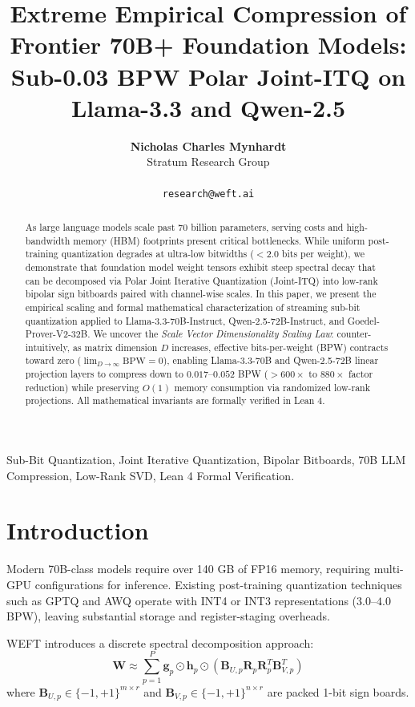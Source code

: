 \documentclass[10pt,journal,compsoc]{IEEEtran}
\title{Extreme Empirical Compression of Frontier 70B+ Foundation Models: Sub-0.03 BPW Polar Joint-ITQ on Llama-3.3 and Qwen-2.5}
\author{
  \textbf{Nicholas Charles Mynhardt} \\
  Stratum Research Group\\
\IEEEmembership{Google DeepMind \& WEFT Research Initiative}\\
\texttt{research@weft.ai}
}
\begin{document}
\maketitle

\begin{abstract}
As large language models scale past 70 billion parameters, serving costs and high-bandwidth memory (HBM) footprints present critical bottlenecks. While uniform post-training quantization degrades at ultra-low bitwidths ($<2.0$ bits per weight), we demonstrate that foundation model weight tensors exhibit steep spectral decay that can be decomposed via Polar Joint Iterative Quantization (Joint-ITQ) into low-rank bipolar sign bitboards paired with channel-wise scales. In this paper, we present the empirical scaling and formal mathematical characterization of streaming sub-bit quantization applied to Llama-3.3-70B-Instruct, Qwen-2.5-72B-Instruct, and Goedel-Prover-V2-32B. We uncover the \textit{Scale Vector Dimensionality Scaling Law}: counter-intuitively, as matrix dimension $D$ increases, effective bits-per-weight (BPW) contracts toward zero ($\lim_{D \to \infty} \text{BPW} = 0$), enabling Llama-3.3-70B and Qwen-2.5-72B linear projection layers to compress down to $0.017$--$0.052$ BPW ($>600\times$ to $880\times$ factor reduction) while preserving $O(1)$ memory consumption via randomized low-rank projections. All mathematical invariants are formally verified in Lean 4.
\end{abstract}

\begin{IEEEkeywords}
Sub-Bit Quantization, Joint Iterative Quantization, Bipolar Bitboards, 70B LLM Compression, Low-Rank SVD, Lean 4 Formal Verification.
\end{IEEEkeywords}

\section{Introduction}
Modern 70B-class models require over 140 GB of FP16 memory, requiring multi-GPU configurations for inference. Existing post-training quantization techniques such as GPTQ and AWQ operate with INT4 or INT3 representations ($3.0$--$4.0$ BPW), leaving substantial storage and register-staging overheads.

WEFT introduces a discrete spectral decomposition approach:
\begin{equation}
\mathbf{W} \approx \sum_{p=1}^P \mathbf{g}_p \odot \mathbf{h}_p \odot \left( \mathbf{B}_{U,p} \mathbf{R}_p \mathbf{R}_p^T \mathbf{B}_{V,p}^T \right)
\end{equation}
where $\mathbf{B}_{U,p} \in \{-1, +1\}^{m \times r}$ and $\mathbf{B}_{V,p} \in \{-1, +1\}^{n \times r}$ are packed 1-bit sign boards.
\end{document}
